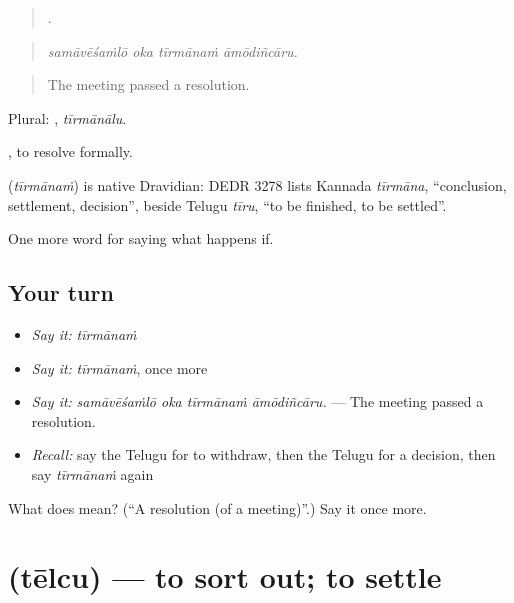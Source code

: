 \begin{quote}
   .
\end{quote}

\begin{quote}
\emph{samāvēśaṁlō oka tīrmānaṁ āmōdiñcāru.}
\end{quote}

\begin{quote}
The meeting passed a resolution.
\end{quote}

Plural: , \emph{tīrmānālu}.

 , to resolve formally.

\begin{cousinweb}
\textbf{} (\emph{tīrmānaṁ}) is native Dravidian: DEDR 3278 lists Kannada \emph{tīrmāna}, \textquotedblleft{}conclusion, settlement, decision\textquotedblright{}, beside Telugu \emph{tīru}, \textquotedblleft{}to be finished, to be settled\textquotedblright{}.
\end{cousinweb}

\begin{grammarlens}[title={What you've built}]
One more word for saying what happens if.
\end{grammarlens}

\subsection*{Your turn}
\begin{itemize}
\raggedright
  \item \emph{Say it:} \emph{tīrmānaṁ}
  \item \emph{Say it:} \emph{tīrmānaṁ}, once more
  \item \emph{Say it:} \emph{samāvēśaṁlō oka tīrmānaṁ āmōdiñcāru.} — The meeting passed a resolution.
  \item \emph{Recall:} say the Telugu for to withdraw, then the Telugu for a decision, then say \emph{tīrmānaṁ} again
\end{itemize}

\begin{tcolorbox}[breakable,colback=teal!4,colframe=teal!35!black,title={Before you move on}]
What does  mean? (\textquotedblleft{}A resolution (of a meeting)\textquotedblright{}.) Say it once more.
\end{tcolorbox}
\section[\texorpdfstring{\te{తేల్చు} (tēlcu)}{తేల్చు (tēlcu)}]{ (tēlcu) — to sort out; to settle}

